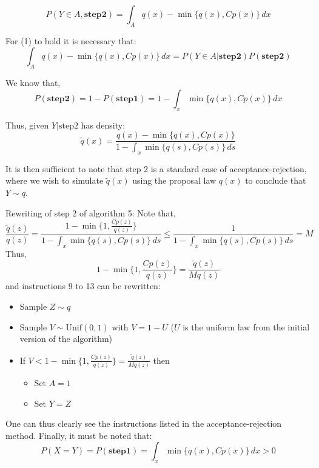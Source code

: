 \documentclass{beamer}
\begin{document}
\begin{frame}

\begin{equation}
P(Y \in A, \mathbf{step2}) = \int_{A} q(x) - \min\{q(x), Cp(x)\} \, dx
\end{equation}

For (1) to hold it is necessary that:
\[
\int_{A} q(x) - \min\{q(x), Cp(x)\} \, dx = P(Y \in A|\mathbf{step2}) P(\mathbf{step2})
\]

We know that,
\[
P(\mathbf{step2}) = 1 - P(\mathbf{step1}) = 1 - \int_{x} \min\{q(x), Cp(x)\} \, dx
\]

Thus, given $Y | \text{step2}$ has density:
$$
\tilde{q}(x) = \frac{q(x) - \min\{q(x), Cp(x)\}}{1 - \int_{x} \min\{q(s), Cp(s)\} \, ds}
$$

It is then sufficient to note that step 2 is a standard case of acceptance-rejection, where we wish to simulate $\tilde{q}(x)$ using the proposal law $q(x)$ to conclude that $Y \sim q$.
\end{frame}
\begin{frame}
Rewriting of step 2 of algorithm 5:  Note that,
\[
\frac{\tilde{q}(z)}{q(z)} = \frac{1 - \min\{1, \frac{Cp(z)}{q(z)}\}}{1 - \int_{x} \min\{q(s), Cp(s)\} \, ds} \leq \frac{1}{1 - \int_{x} \min\{q(s), Cp(s)\} \, ds} = M
\]
Thus,
\[
1 - \min\{1, \frac{Cp(z)}{q(z)}\} = \frac{\tilde{q}(z)}{Mq(z)}
\]
and instructions 9 to 13 can be rewritten:
\begin{itemize}
\item Sample $Z \sim q$
\item Sample $V \sim \text{Unif}(0,1)$ with $V = 1-U$ ($U$ is the uniform law from the initial version of the algorithm)
\item If $V < 1 - \min\{1, \frac{Cp(z)}{q(z)}\} = \frac{\tilde{q}(z)}{Mq(z)}$ then
\begin{itemize}
    \item Set $A=1$
    \item Set $Y=Z$
\end{itemize}
\end{itemize}
One can thus clearly see the instructions listed in the acceptance-rejection method.
Finally, it must be noted that:
\[
P(X = Y) = P(\mathbf{step1}) = \int_{x} \min\{q(x), Cp(x)\} \, dx > 0
\]
\end{frame}
\end{document}
